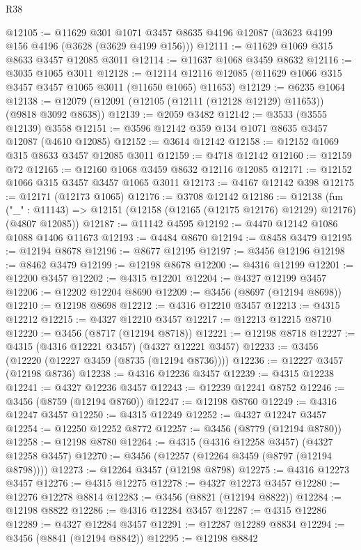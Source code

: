 \begin{lexlean}{R38}
\begin{coremodule}
@12105 := @11629
    @301
    @1071
    @3457
    @8635
    @4196
    @12087
    (@3623 @4199 @156 @4196 (@3628 (@3629 @4199 @156)))
@12111 := @11629 @1069 @315 @8633 @3457 @12085 @3011
@12114 := @11637 @1068 @3459 @8632
@12116 := @3035 @1065 @3011
@12128 := @12114 @12116 @12085 (@11629 @1066 @315 @3457 @3457 @1065 @3011 (@11650 @1065) @11653)
@12129 := @6235 @1064
@12138 := @12079 (@12091 (@12105 (@12111 (@12128 @12129) @11653)) (@9818 @3092 @8638))
@12139 := @2059 @3482
@12142 := @3533 (@3555 @12139) @3558
@12151 := @3596 @12142 @359 @134 @1071 @8635 @3457 @12087 (@4610 @12085)
@12152 := @3614 @12142
@12158 := @12152 @1069 @315 @8633 @3457 @12085 @3011
@12159 := @4718 @12142
@12160 := @12159 @72
@12165 := @12160 @1068 @3459 @8632 @12116 @12085
@12171 := @12152 @1066 @315 @3457 @3457 @1065 @3011
@12173 := @4167 @12142 @398
@12175 := @12171 (@12173 @1065)
@12176 := @3708 @12142
@12186 := @12138
    (fun ("_" : @11143) => @12151 (@12158 (@12165 (@12175 @12176) @12129) @12176) (@4807 @12085))
@12187 := @11142 @4595
@12192 := @4470 @12142 @1086 @1088 @1406 @11673
@12193 := @4484 @8670
@12194 := @8458 @3479
@12195 := @12194 @8678
@12196 := @8677 @12195
@12197 := @3456 @12196
@12198 := @8462 @3479
@12199 := @12198 @8678
@12200 := @4316 @12199
@12201 := @12200 @3457
@12202 := @4315 @12201
@12204 := @4327 @12199 @3457
@12206 := @12202 @12204 @8690
@12209 := @3456 (@8697 (@12194 @8698))
@12210 := @12198 @8698
@12212 := @4316 @12210 @3457
@12213 := @4315 @12212
@12215 := @4327 @12210 @3457
@12217 := @12213 @12215 @8710
@12220 := @3456 (@8717 (@12194 @8718))
@12221 := @12198 @8718
@12227 := @4315 (@4316 @12221 @3457) (@4327 @12221 @3457)
@12233 := @3456 (@12220 (@12227 @3459 (@8735 (@12194 @8736))))
@12236 := @12227 @3457 (@12198 @8736)
@12238 := @4316 @12236 @3457
@12239 := @4315 @12238
@12241 := @4327 @12236 @3457
@12243 := @12239 @12241 @8752
@12246 := @3456 (@8759 (@12194 @8760))
@12247 := @12198 @8760
@12249 := @4316 @12247 @3457
@12250 := @4315 @12249
@12252 := @4327 @12247 @3457
@12254 := @12250 @12252 @8772
@12257 := @3456 (@8779 (@12194 @8780))
@12258 := @12198 @8780
@12264 := @4315 (@4316 @12258 @3457) (@4327 @12258 @3457)
@12270 := @3456 (@12257 (@12264 @3459 (@8797 (@12194 @8798))))
@12273 := @12264 @3457 (@12198 @8798)
@12275 := @4316 @12273 @3457
@12276 := @4315 @12275
@12278 := @4327 @12273 @3457
@12280 := @12276 @12278 @8814
@12283 := @3456 (@8821 (@12194 @8822))
@12284 := @12198 @8822
@12286 := @4316 @12284 @3457
@12287 := @4315 @12286
@12289 := @4327 @12284 @3457
@12291 := @12287 @12289 @8834
@12294 := @3456 (@8841 (@12194 @8842))
@12295 := @12198 @8842

\end{coremodule}
\end{lexlean}
